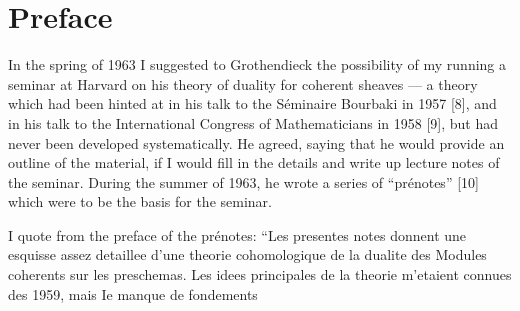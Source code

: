 \chapter*{Preface}
In the spring of 1963 I suggested to 
Grothendieck the possibility of my running a seminar 
at Harvard on his theory of duality for coherent sheaves 
--- a theory which had been hinted at in his talk 
to the S\'eminaire Bourbaki in 1957 [8],
and in his talk to the International Congress of Mathematicians
in 1958 [9], but had never been developed systematically. 
He agreed, saying that 
he would provide an outline of the material,
if I would fill in the details and write up lecture notes 
of the seminar. 
During the summer of 1963, he wrote a series
of ``pr\'enotes'' [10] 
which were to be the basis for the seminar.

I quote from the preface of the pr\'enotes:
``Les presentes notes donnent 
une esquisse assez detaillee d'une theorie cohomologique 
de la dualite des Modules coherents sur les preschemas. 
Les idees principales de la theorie m'etaient connues des 1959, 
mais Ie manque de fondements
